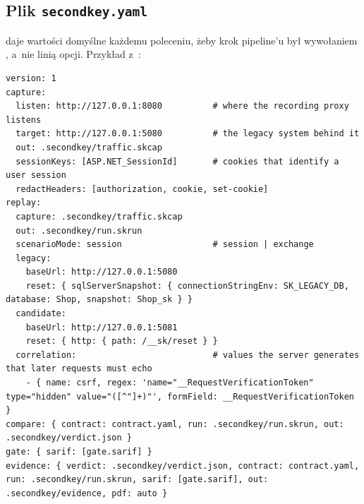 
\subsection{Plik \texttt{secondkey.yaml}}\label{sec:cli-konfiguracja}

 daje wartości domyślne każdemu poleceniu, żeby krok pipeline'u był
wywołaniem , a~nie linią opcji. Przykład z~:

\begin{lstlisting}
version: 1
capture:
  listen: http://127.0.0.1:8080          # where the recording proxy listens
  target: http://127.0.0.1:5080          # the legacy system behind it
  out: .secondkey/traffic.skcap
  sessionKeys: [ASP.NET_SessionId]       # cookies that identify a user session
  redactHeaders: [authorization, cookie, set-cookie]
replay:
  capture: .secondkey/traffic.skcap
  out: .secondkey/run.skrun
  scenarioMode: session                  # session | exchange
  legacy:
    baseUrl: http://127.0.0.1:5080
    reset: { sqlServerSnapshot: { connectionStringEnv: SK_LEGACY_DB, database: Shop, snapshot: Shop_sk } }
  candidate:
    baseUrl: http://127.0.0.1:5081
    reset: { http: { path: /__sk/reset } }
  correlation:                           # values the server generates that later requests must echo
    - { name: csrf, regex: 'name="__RequestVerificationToken" type="hidden" value="([^"]+)"', formField: __RequestVerificationToken }
compare: { contract: contract.yaml, run: .secondkey/run.skrun, out: .secondkey/verdict.json }
gate: { sarif: [gate.sarif] }
evidence: { verdict: .secondkey/verdict.json, contract: contract.yaml, run: .secondkey/run.skrun, sarif: [gate.sarif], out: .secondkey/evidence, pdf: auto }
\end{lstlisting}


